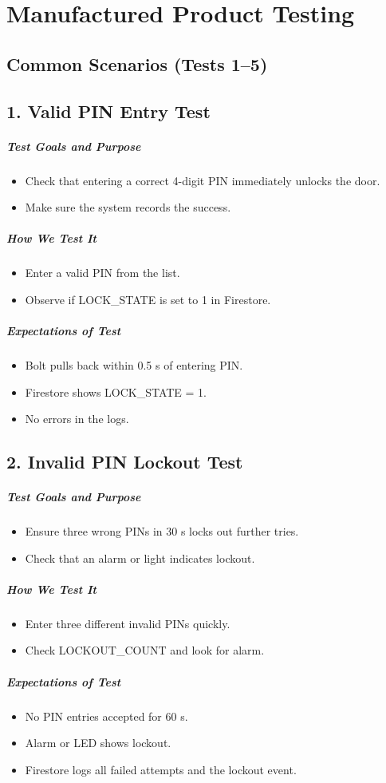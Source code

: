\newpage
\section{Manufactured Product Testing}

\subsection*{Common Scenarios (Tests 1–5)}

\subsection*{1. Valid PIN Entry Test}
\subparagraph{Test Goals and Purpose}
\begin{itemize}
    \item Check that entering a correct 4-digit PIN immediately unlocks the door.
    \item Make sure the system records the success.
\end{itemize}
\subparagraph{How We Test It}
\begin{itemize}
    \item Enter a valid PIN from the list.
    \item Observe if LOCK\_STATE is set to 1 in Firestore.
\end{itemize}
\subparagraph{Expectations of Test}
\begin{itemize}
    \item Bolt pulls back within 0.5 s of entering PIN.
    \item Firestore shows LOCK\_STATE = 1.
    \item No errors in the logs.
\end{itemize}

\subsection*{2. Invalid PIN Lockout Test}
\subparagraph{Test Goals and Purpose}
\begin{itemize}
    \item Ensure three wrong PINs in 30 s locks out further tries.
    \item Check that an alarm or light indicates lockout.
\end{itemize}
\subparagraph{How We Test It}
\begin{itemize}
    \item Enter three different invalid PINs quickly.
    \item Check LOCKOUT\_COUNT and look for alarm.
\end{itemize}
\subparagraph{Expectations of Test}
\begin{itemize}
    \item No PIN entries accepted for 60 s.
    \item Alarm or LED shows lockout.
    \item Firestore logs all failed attempts and the lockout event.
\end{itemize}

